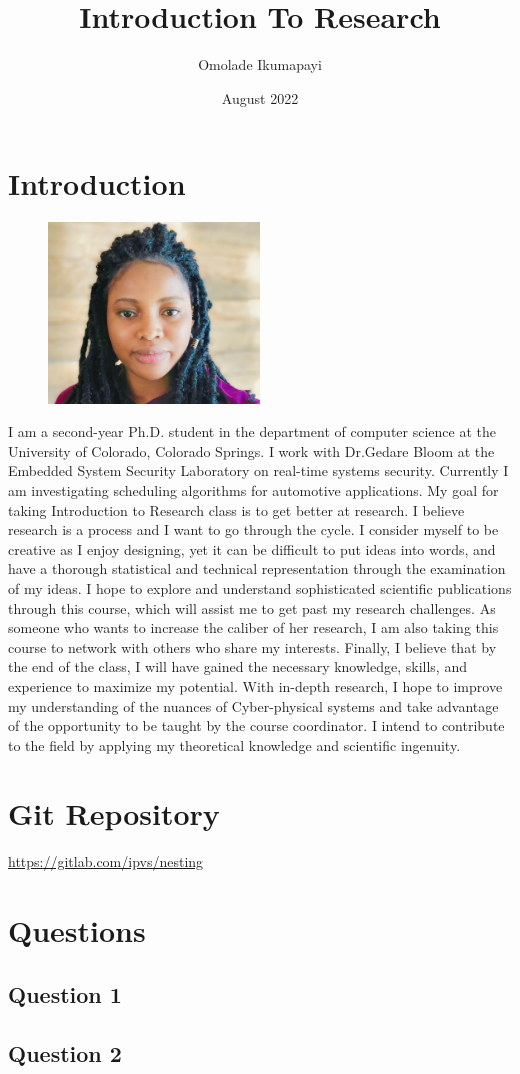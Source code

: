 \documentclass{article}
\title{Introduction To Research}
\author{Omolade Ikumapayi}
\date{August 2022}
\begin{document}
\maketitle

\section{Introduction}

\begin{figure}[h!]
  \centering
  \includegraphics[width=0.5\textwidth]{omolade_.jpg}
\end{figure}

I am a second-year Ph.D. student in the department of computer science at the University of Colorado, Colorado Springs. I work with Dr.Gedare Bloom at the Embedded System Security Laboratory on real-time systems security. Currently I am investigating scheduling algorithms for automotive applications. My goal for taking Introduction to Research class is to get better at research. I believe research is a process and I want to go through the cycle. I consider myself to be creative as I enjoy designing, yet it can be difficult to put ideas into words, and have a thorough statistical and technical representation through the examination of my ideas.
I hope to explore and understand sophisticated scientific publications through this course, which will assist me to get past my research challenges. As someone who wants to increase the caliber of her research, I am also taking this course to network with others who share my interests.
Finally, I believe that by the end of the class, I will have gained the necessary knowledge, skills, and experience to  maximize my potential. With in-depth research, I hope to improve my understanding of the nuances of Cyber-physical systems and take advantage of the opportunity to be taught by the course coordinator. I intend to contribute to the field by applying my theoretical knowledge and scientific ingenuity.
\section{Git Repository}

\url{https://gitlab.com/ipvs/nesting}
\section{Questions}
\subsection{Question 1}


\subsection{Question 2}
\end{document}
